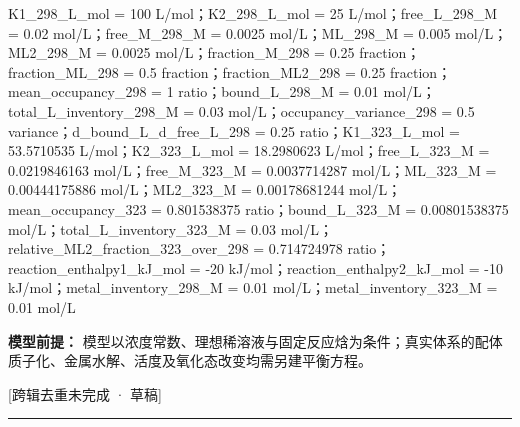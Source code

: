 \documentclass[UTF8,11pt,a4paper]{ctexart}
\begin{document}
K1\_298\_L\_mol = 100 L/mol；K2\_298\_L\_mol = 25 L/mol；free\_L\_298\_M = 0.02 mol/L；free\_M\_298\_M = 0.0025 mol/L；ML\_298\_M = 0.005 mol/L；ML2\_298\_M = 0.0025 mol/L；fraction\_M\_298 = 0.25 fraction；fraction\_ML\_298 = 0.5 fraction；fraction\_ML2\_298 = 0.25 fraction；mean\_occupancy\_298 = 1 ratio；bound\_L\_298\_M = 0.01 mol/L；total\_L\_inventory\_298\_M = 0.03 mol/L；occupancy\_variance\_298 = 0.5 variance；d\_bound\_L\_d\_free\_L\_298 = 0.25 ratio；K1\_323\_L\_mol = 53.5710535 L/mol；K2\_323\_L\_mol = 18.2980623 L/mol；free\_L\_323\_M = 0.0219846163 mol/L；free\_M\_323\_M = 0.0037714287 mol/L；ML\_323\_M = 0.00444175886 mol/L；ML2\_323\_M = 0.00178681244 mol/L；mean\_occupancy\_323 = 0.801538375 ratio；bound\_L\_323\_M = 0.00801538375 mol/L；total\_L\_inventory\_323\_M = 0.03 mol/L；relative\_ML2\_fraction\_323\_over\_298 = 0.714724978 ratio；reaction\_enthalpy1\_kJ\_mol = -20 kJ/mol；reaction\_enthalpy2\_kJ\_mol = -10 kJ/mol；metal\_inventory\_298\_M = 0.01 mol/L；metal\_inventory\_323\_M = 0.01 mol/L\par
\noindent\textbf{模型前提：}
模型以浓度常数、理想稀溶液与固定反应焓为条件；真实体系的配体质子化、金属水解、活度及氧化态改变均需另建平衡方程。\par
\noindent\textcolor{red!65!black}{[跨辑去重未完成 · 草稿]} \par
\medskip\hrule\medskip
{}
\end{document}
